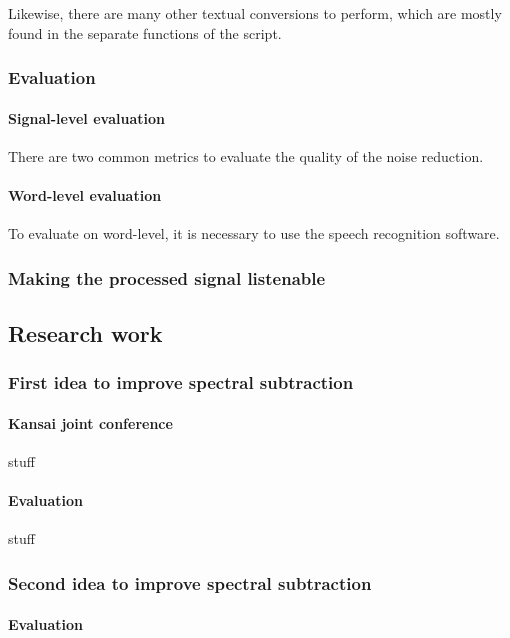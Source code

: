 Likewise, there are many other textual conversions to perform, which are mostly found in the separate functions of the script.
\subsubsection{Evaluation}
\paragraph{Signal-level evaluation}
There are two common metrics\cite{horii2013musical} to evaluate the quality of the noise reduction.
\paragraph{Word-level evaluation}
To evaluate on word-level, it is necessary to use the speech recognition software.
\subsubsection{Making the processed signal listenable}
\subsection{Research work}
\subsubsection{First idea to improve spectral subtraction}
\paragraph{Kansai joint conference}
stuff
\paragraph{Evaluation}
stuff
\subsubsection{Second idea to improve spectral subtraction}
\paragraph{Evaluation}